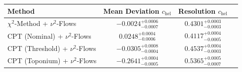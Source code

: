     \begin{tabular}{lccc}
        \toprule
        Method & Mean Deviation $c_{\text{hel}}$ & Resolution $c_{\text{hel}}$ \\
        \midrule
        $\chi^2$-Method + $\nu^2$-Flows & $-0.0024^{+0.0006}_{-0.0007}$ & $0.4301^{+0.0003}_{-0.0003}$ \\
        CPT (Nominal) + $\nu^2$-Flows & $0.0248^{+0.0004}_{-0.0006}$ & $0.4117^{+0.0004}_{-0.0005}$ \\
        CPT (Threshold) + $\nu^2$-Flows & $-0.0305^{+0.0008}_{-0.0004}$ & $0.4537^{+0.0004}_{-0.0003}$ \\
        CPT (Toponium) + $\nu^2$-Flows & $-0.2641^{+0.0004}_{-0.0005}$ & $0.5365^{+0.0005}_{-0.0007}$ \\
        \bottomrule
    \end{tabular}